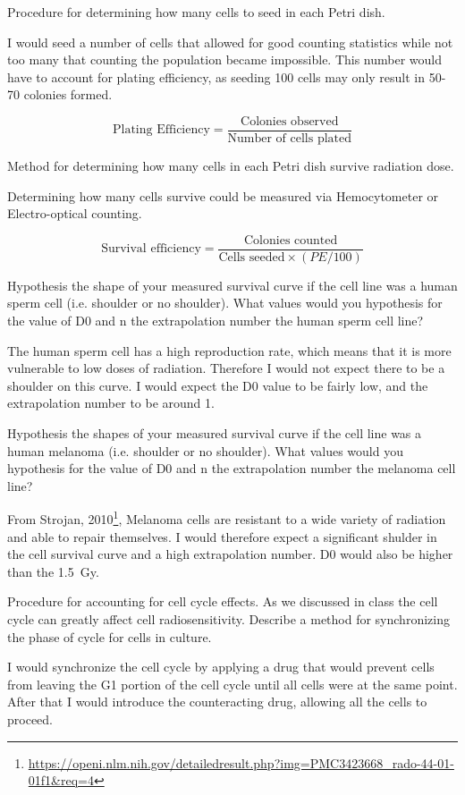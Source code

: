 \documentclass{hw}
\begin{document}
\problem{}
Procedure for determining how many cells to seed in each Petri dish.

\solution
I would seed a number of cells that allowed for good counting statistics while not too many that counting the population became impossible. This number would have to account for plating efficiency, as seeding 100 cells may only result in 50-70 colonies formed.

$$
\text{Plating Efficiency}=\frac{\text{Colonies observed}}{\text{Number of cells plated}}
$$

\problem{}
Method for determining how many cells in each Petri dish survive radiation dose.

\solution
Determining how many cells survive could be measured via Hemocytometer or Electro-optical counting.

$$
    \text{Survival efficiency} = \frac{\text{Colonies counted}}{\text{Cells seeded} \times \left(PE/100\right)}
$$

\problem{}
Hypothesis the shape of your measured survival curve if the cell line was a human sperm cell (i.e. shoulder or no shoulder). What values would you hypothesis for the value of D0 and n the extrapolation number the human sperm cell line?

\solution
The human sperm cell has a high reproduction rate, which means that it is more vulnerable to low doses of radiation. Therefore I would not expect there to be a shoulder on this curve. I would expect the D0 value to be fairly low, and the extrapolation number to be around 1.

\problem{}
Hypothesis the shapes of your measured survival curve if the cell line was a human melanoma (i.e. shoulder or no shoulder). What values would you hypothesis for the value of D0 and n the extrapolation number the melanoma cell line?

\solution
From Strojan, 2010\footnote{\url{https://openi.nlm.nih.gov/detailedresult.php?img=PMC3423668_rado-44-01-01f1&req=4}}, Melanoma cells are resistant to a wide variety of radiation and able to repair themselves. I would therefore expect a significant shulder in the cell survival curve and a high extrapolation number. D0 would also be higher than the \SI{1.5}{\gray}.

\problem{}
Procedure for accounting for cell cycle effects. As we discussed in class the cell cycle can greatly affect cell radiosensitivity. Describe a method for synchronizing the phase of cycle for cells in culture.

\solution
I would synchronize the cell cycle by applying a drug that would prevent cells from leaving the G1 portion of the cell cycle until all cells were at the same point. After that I would introduce the counteracting drug, allowing all the cells to proceed.
\end{document}

